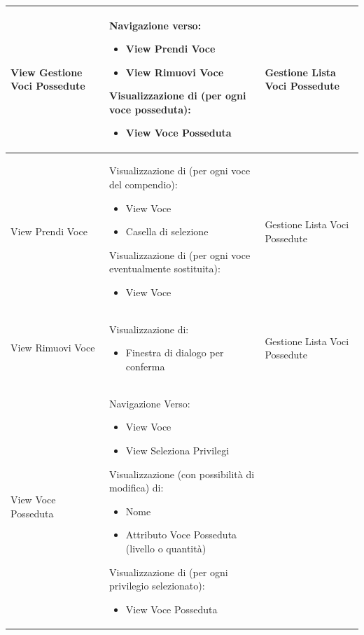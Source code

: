\documentclass[a4paper, 11pt]{article}
\begin{document}
\begin{adjustwidth}{-1.5cm}{-1.5cm}
\begin{center}
\begin{longtable}{|p{5cm}|p{5cm}|p{5cm}|}
        View Gestione Voci Possedute & Navigazione verso:
        \begin{itemize}
            \item View Prendi Voce
            \item View Rimuovi Voce
        \end{itemize}
        Visualizzazione di (per ogni voce posseduta):
        \begin{itemize}
            \item View Voce Posseduta
        \end{itemize} & Gestione Lista Voci Possedute \\ \hline
        
        View Prendi Voce & Visualizzazione di (per ogni voce del compendio):
        \begin{itemize}
            \item View Voce
            \item Casella di selezione
        \end{itemize}
        Visualizzazione di (per ogni voce eventualmente sostituita):
        \begin{itemize}
            \item View Voce
        \end{itemize} & Gestione Lista Voci Possedute \\ \hline
        
        View Rimuovi Voce & Visualizzazione di:
        \begin{itemize}
            \item Finestra di dialogo per conferma
        \end{itemize} & Gestione Lista Voci Possedute \\ \hline
        
        View Voce Posseduta & Navigazione Verso:
        \begin{itemize}
            \item View Voce
            \item View Seleziona Privilegi
        \end{itemize}
        Visualizzazione (con possibilità di modifica) di:
        \begin{itemize}
            \item Nome
            \item Attributo Voce Posseduta (livello o quantità)
        \end{itemize}
        Visualizzazione di (per ogni privilegio selezionato):
        \begin{itemize}
            \item View Voce Posseduta
        \end{itemize} &  \\ \hline
        

\end{longtable}
\end{center}
\end{adjustwidth}
\end{document}
